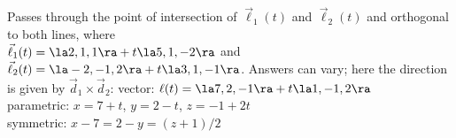 {Passes through the point of intersection of $\vec\ell_1(t)$ and $\vec\ell_2(t)$ and orthogonal to both lines, where\\
$\vec\ell_1(t) = \la 2,1,1\ra + t\la5,1,-2\ra$ and \\$\vec\ell_2(t) = \la-2,-1,2\ra+t\la 3,1,-1\ra$.
}
{Answers can vary; here the direction is given by $\vec d_1\times \vec d_2$:
vector: $\ell(t) = \la 7,2,-1\ra + t\la 1,-1,2\ra$\\
parametric: $x= 7+t$, $y=2-t$, $z = -1+2t$\\
symmetric: $x-7=2-y=(z+1)/2$
}


